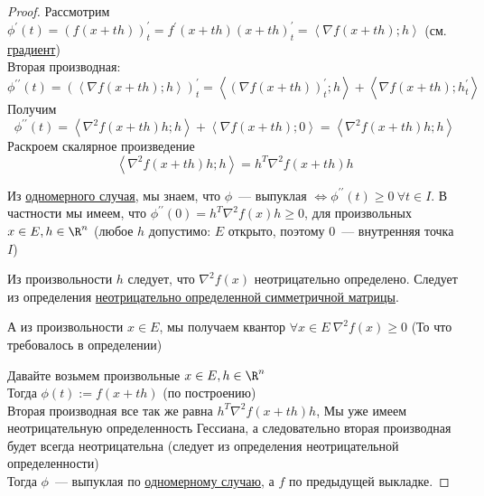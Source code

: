 \begin{proof}
  Рассмотрим $\phi^{\prime}(t) = \left( f(x+th) \right)^{\prime}_t = f^{\prime}(x + th) (x + th)^{\prime}_t = \left\langle \nabla f (x + th); h \right\rangle$ (см. \hyperref[note:1756907B-1FF2-4F62-8553-759B8509281C]{градиент}) \\
  Вторая производная:
  \[
  \phi^{\prime \prime}(t) = \left(  \left\langle \nabla f(x +th); h \right\rangle \right)^{\prime}_t =
  \left\langle \left( \nabla f(x +th) \right)^{\prime}_t; h \right\rangle  +
   \left\langle \nabla f(x +th); h^{\prime}_t \right\rangle
  \]
  Получим
  \[
  \phi^{\prime \prime}(t) = \left\langle \nabla^2 f(x +th) h; h \right\rangle + \left\langle \nabla f(x+th); 0 \right\rangle
  = \left\langle \nabla^2 f(x +th) h; h \right\rangle
  \]
  Раскроем скалярное произведение
  \[
  \left\langle \nabla^2 f(x +th) h; h \right\rangle = h^T \nabla^2 f(x +th) h
  \]

  Из \hyperref[note:9CEE854D-ED37-4C08-82EB-E41B36C43EA6]{одномерного случая}, мы знаем, что $\phi$~--- выпуклая $\Leftrightarrow \phi^{\prime\prime}(t) \ge 0\ \forall t \in I$.
  В частности мы имеем, что $\phi^{\prime \prime} (0) = h^T \nabla^2 f(x) h \ge 0$, для произвольных $x \in E,h \in \R^n$ (любое $h$ допустимо: $E$ открыто, поэтому $0$~--- внутренняя точка $I$)

  Из произвольности $h$ следует, что $\nabla^2 f(x)$  неотрицательно определено. Следует из определения \hyperref[note:771B93FA-654D-4233-9487-B4FDD356DDFE]{неотрицательно определенной симметричной матрицы}.

  А из произвольности $x \in E$, мы получаем квантор $\forall x \in E\ \nabla^2 f(x) \ge 0$ (То что требовалось в определении)

  \proofstep{$\Leftarrow$}
  Давайте возьмем произвольные $x \in E, h \in \R^{n}$ \\
  Тогда $\phi(t) := f(x + th)$  (по построению) \\
  Вторая производная все так же равна $h^T \nabla^2f(x +th) h$,
  Мы уже имеем неотрицательную определенность Гессиана,
  а следовательно вторая производная будет всегда неотрицательна
  (следует из определения неотрицательной определенности) \\
  Тогда $\phi$~--- выпуклая по \hyperref[note:9CEE854D-ED37-4C08-82EB-E41B36C43EA6]{одномерному случаю}, а $f$ по предыдущей выкладке.
\end{proof}
